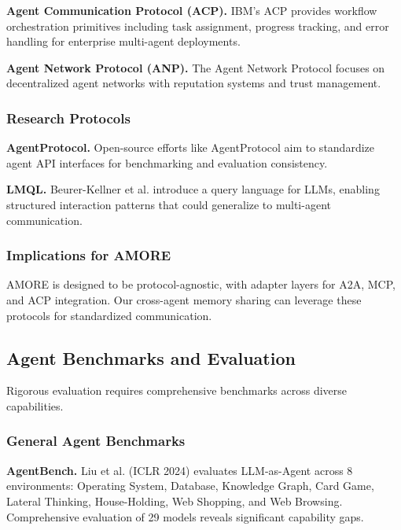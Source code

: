 \documentclass{article}
\theoremstyle{plain}
\theoremstyle{definition}
\theoremstyle{remark}
\begin{document}
\textbf{Agent Communication Protocol (ACP).} IBM's ACP \citep{ibm2025acp} provides workflow orchestration primitives including task assignment, progress tracking, and error handling for enterprise multi-agent deployments.

\textbf{Agent Network Protocol (ANP).} The Agent Network Protocol \citep{anp2025} focuses on decentralized agent networks with reputation systems and trust management.

\subsubsection{Research Protocols}

\textbf{AgentProtocol.} Open-source efforts like AgentProtocol aim to standardize agent API interfaces for benchmarking and evaluation consistency.

\textbf{LMQL.} Beurer-Kellner et al. \citep{beurer2023lmql} introduce a query language for LLMs, enabling structured interaction patterns that could generalize to multi-agent communication.

\subsubsection{Implications for AMORE}

AMORE is designed to be protocol-agnostic, with adapter layers for A2A, MCP, and ACP integration. Our cross-agent memory sharing can leverage these protocols for standardized communication.

\subsection{Agent Benchmarks and Evaluation}
\label{sec:related_benchmarks}

Rigorous evaluation requires comprehensive benchmarks across diverse capabilities.

\subsubsection{General Agent Benchmarks}

\textbf{AgentBench.} Liu et al. \citep{liu2024agentbench} (ICLR 2024) evaluates LLM-as-Agent across 8 environments: Operating System, Database, Knowledge Graph, Card Game, Lateral Thinking, House-Holding, Web Shopping, and Web Browsing. Comprehensive evaluation of 29 models reveals significant capability gaps.
\end{document}
